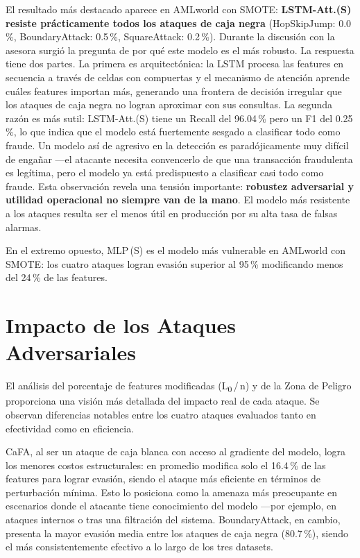 El resultado más destacado aparece en AMLworld con SMOTE: \textbf{LSTM-Att.(S) resiste prácticamente todos los ataques de caja negra} (HopSkipJump: 0.0\,\%, BoundaryAttack: 0.5\,\%, SquareAttack: 0.2\,\%). Durante la discusión con la asesora surgió la pregunta de por qué este modelo es el más robusto. La respuesta tiene dos partes. La primera es arquitectónica: la LSTM procesa las features en secuencia a través de celdas con compuertas y el mecanismo de atención aprende cuáles features importan más, generando una frontera de decisión irregular que los ataques de caja negra no logran aproximar con sus consultas. La segunda razón es más sutil: LSTM-Att.(S) tiene un Recall del 96.04\,\% pero un F1 del 0.25\,\%, lo que indica que el modelo está fuertemente sesgado a clasificar todo como fraude. Un modelo así de agresivo en la detección es paradójicamente muy difícil de engañar —el atacante necesita convencerlo de que una transacción fraudulenta es legítima, pero el modelo ya está predispuesto a clasificar casi todo como fraude. Esta observación revela una tensión importante: \textbf{robustez adversarial y utilidad operacional no siempre van de la mano}. El modelo más resistente a los ataques resulta ser el menos útil en producción por su alta tasa de falsas alarmas.

En el extremo opuesto, MLP\,(S) es el modelo más vulnerable en AMLworld con SMOTE: los cuatro ataques logran evasión superior al 95\,\% modificando menos del 24\,\% de las features.

\section{Impacto de los Ataques Adversariales}

El análisis del porcentaje de features modificadas (L\textsubscript{0}\,/\,n) y de la Zona de Peligro proporciona una visión más detallada del impacto real de cada ataque. Se observan diferencias notables entre los cuatro ataques evaluados tanto en efectividad como en eficiencia.

CaFA, al ser un ataque de caja blanca con acceso al gradiente del modelo, logra los menores costos estructurales: en promedio modifica solo el 16.4\,\% de las features para lograr evasión, siendo el ataque más eficiente en términos de perturbación mínima. Esto lo posiciona como la amenaza más preocupante en escenarios donde el atacante tiene conocimiento del modelo —por ejemplo, en ataques internos o tras una filtración del sistema. BoundaryAttack, en cambio, presenta la mayor evasión media entre los ataques de caja negra (80.7\,\%), siendo el más consistentemente efectivo a lo largo de los tres datasets.

